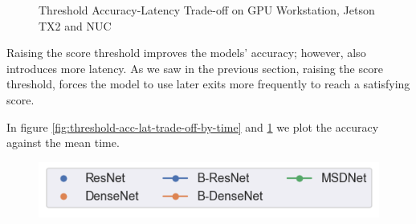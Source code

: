 \begin{figure}
	\caption[Threshold Accuracy-Latency Trade-off]{Threshold Accuracy-Latency Trade-off on \protect{} GPU Workstation, \protect{} Jetson TX2 and \protect{} NUC }
	\label{fig:threshold-acc-lat-trade-off}
\end{figure}

Raising the score threshold improves the models' accuracy; however, also introduces more latency. As we saw in the previous section, raising the score threshold, forces the model to use later exits more frequently to reach a satisfying score. 

In figure \ref{fig:threshold-acc-lat-trade-off-by-time} and \ref{fig:threshold-acc-lat-trade-off} we plot the accuracy against the mean time.
\begin{figure}
	\captionsetup[subfigure]{justification=centering,farskip=0pt,captionskip=0pt}
	\centering
	\includegraphics[width=.4\linewidth]{figures/threshold_plots/inference_by_time_legend}
	\hfill

\end{figure}
